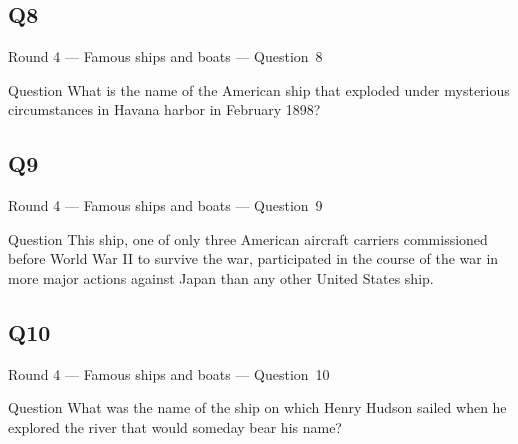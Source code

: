 \documentclass[11pt]{beamer}
\begin{document}
\subsection*{Q8}
\begin{frame}[t]{Round 4 --- Famous ships and boats --- \mbox{Question 8}}
    \vspace{-0.5em}
    \begin{block}{Question}
        What is the name of the  American ship that exploded under mysterious circumstances in Havana harbor in February 1898?
    \end{block}
\end{frame}
\subsection*{Q9}
\begin{frame}[t]{Round 4 --- Famous ships and boats --- \mbox{Question 9}}
    \vspace{-0.5em}
    \begin{block}{Question}
        This ship, one of only three American aircraft carriers commissioned before World War II to survive the war, participated in the course of the war in more major actions against Japan than any other United States ship.
    \end{block}
\end{frame}
\subsection*{Q10}
\begin{frame}[t]{Round 4 --- Famous ships and boats --- \mbox{Question 10}}
    \vspace{-0.5em}
    \begin{block}{Question}
        What was the name of the ship on which Henry Hudson sailed when he explored the river that would someday bear his name?
    \end{block}
\end{frame}
\end{document}
